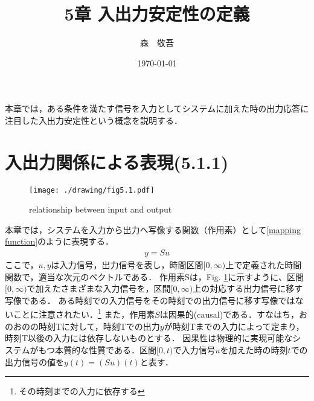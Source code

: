 \documentclass[a4paper,11pt,uplatex]{jsarticle} %
\author{森　敬吾}
\date{\today}
\title{5章 入出力安定性の定義}
\theoremstyle{definition}	%
\newcommand{\figref}[1]{Fig. \ref{#1}}
\begin{document}
\maketitle %
\tableofcontents %
\pagestyle{fancy}
\lhead{\today}



本章では，ある条件を満たす信号を入力としてシステムに加えた時の出力応答に注目した入出力安定性という概念を説明する．
\section{入出力関係による表現(5.1.1)}
\begin{figure}[t]
\centering
\texttt{[image: ./drawing/fig5.1.pdf]}
\caption{relationship between input and output}
\label{fig5.1}
\end{figure}
本章では，システムを入力から出力へ写像する関数（作用素）として\eqref{mapping function}のように表現する．
\begin{align}
\label{mapping function}
    y = S u
\end{align}
ここで，$ u, y $は入力信号，出力信号を表し，時間区間$ [ 0 , \infty )$上で定義された時間関数で，適当な次元のベクトルである．
作用素Sは，\figref{fig5.1}に示すように、区間$ [ 0 , \infty ) $で加えたさまざまな入力信号を，区間$ [ 0 , \infty )$上の対応する出力信号に移す写像である．
ある時刻での入力信号をその時刻での出力信号に移す写像ではないことに注意されたい．\footnote{その時刻までの入力に依存する}
また，作用素$S$は因果的(causal)である．すなはち，おのおのの時刻Tに対して，時刻Tでの出力$y$が時刻Tまでの入力によって定まり，時刻T以後の入力には依存しないものとする．
因果性は物理的に実現可能なシステムがもつ本質的な性質である．区間$ [ 0, t )$で入力信号$u$を加えた時の時刻$t$での出力信号の値を$y(t) = (Su) (t)$と表す．
\end{document}
